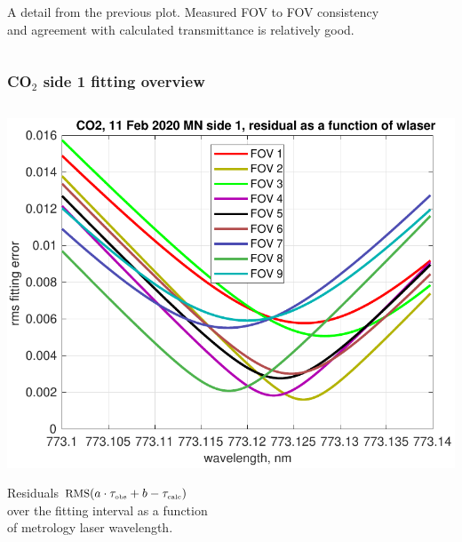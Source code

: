 \documentclass[9pt]{beamer}
\begin{document}
\begin{frame}
\begin{columns}[t]
\begin{column}{0.5\textwidth}
A detail from the previous plot.  Measured FOV to FOV consistency \\
and agreement with calculated transmittance is relatively good.

\end{column}
\end{columns}
\end{frame}
\begin{frame}
\frametitle{CO$_2$ side 1 fitting overview}
\begin{columns}[t]
\begin{column}{0.5\textwidth}
  \begin{centering}
  \includegraphics[width=\textwidth]{02-11_mn_s1_CO2/CO2_wlaser_fit.pdf}
  \end{centering}\vspace{3mm}

Residuals $\mbox{\small RMS}(a\cdot\tau_{\mbox{\tiny obs}} + b - \tau_{\mbox{\tiny calc}})$ \\ over the fitting
interval as a function \\ of metrology laser wavelength.


\end{column}
\end{columns}
\end{frame}
\end{document}
